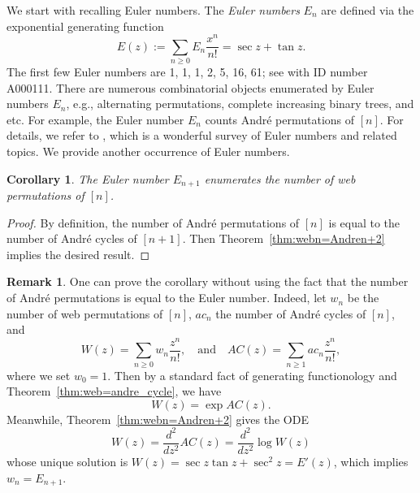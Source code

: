 \documentclass[reqno,12pt]{amsart}
\newtheorem{cor}[thm]{Corollary}
\theoremstyle{definition}
\newtheorem{rmk}[thm]{Remark}
\theoremstyle{remark}
\newcommand\qand{\quad\mbox{and}\quad}
\begin{document}
We start with recalling Euler numbers.
The \emph{Euler numbers} \( E_n \) are defined via the exponential
generating function
\[
  E(z) := \sum_{n\ge 0} E_n \frac{x^n}{n!} = \sec z + \tan z.
\]
The first few Euler numbers are 1, 1, 1, 2, 5, 16, 61;
see \cite{OEIS} with ID number A000111.
There are numerous combinatorial objects enumerated by Euler numbers \( E_n \),
e.g., alternating permutations, complete increasing binary trees, and etc.
For example, the Euler number \( E_n \) counts Andr\'e permutations of \( [n] \).
For details, we refer to \cite{Sta10}, which is a wonderful survey of Euler numbers and related topics.
We provide another occurrence of Euler numbers.

\begin{cor} \label{cor:Euler}
  The Euler number \( E_{n+1} \) enumerates
  the number of web permutations of \( [n] \).
\end{cor}
\begin{proof}
  By definition, the number of Andr\'e permutations of \( [n] \) is equal to
  the number of Andr\'e cycles of \( [n+1] \).
  Then Theorem~\ref{thm:webn=Andren+2} implies the desired result.
\end{proof}
\begin{rmk}
  One can prove the corollary without using the fact that the number of Andr\'e
  permutations is equal to the Euler number.
  Indeed, let \( w_n \) be the number of web permutations of \( [n] \),
  \( ac_n \) the number of Andr\'e cycles of \( [n] \), and
  \[
    W(z) = \sum_{n\ge 0} w_n \frac{z^n}{n!}, \qand
    AC(z) = \sum_{n\ge 1} ac_n \frac{z^n}{n!},
  \]
  where we set \( w_0 = 1 \).
  Then by a standard fact of generating functionology \cite[Corollary~5.1.6]{Sta99} and Theorem~\ref{thm:web=andre_cycle},
  we have
  \[
    W(z) = \exp AC(z).
  \]
  Meanwhile, Theorem~\ref{thm:webn=Andren+2} gives the ODE
  \[
    W(z) = \frac{d^2}{dz^2} AC(z) = \frac{d^2}{dz^2} \log W(z)
  \]
  whose unique solution is \( W(z) = \sec z \tan z + \sec^2 z =  E'(z) \), which implies \( w_n = E_{n+1} \).
\end{rmk}
\end{document}
